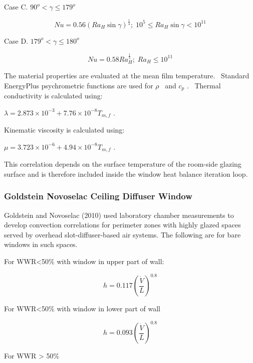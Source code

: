 Case C. \(90^o < \gamma \leq 179^o\)

\begin{equation}
Nu = 0.56{\left( {R{a_H}\sin \gamma } \right)^{{\frac{1}{4}}}};\;{10^5} \le R{a_H}\sin \gamma  < {10^{11}}
\end{equation}

Case D. \(179^o < \gamma \leq 180^o\)

\begin{equation}
Nu = 0.58Ra_H^{{\frac{1}{5}}};\;R{a_H} \le {10^{11}}
\end{equation}

The material properties are evaluated at the mean film temperature.~ Standard EnergyPlus psychrometric functions are used for \(\rho\) ~and \({c_p}\) .~ Thermal conductivity is calculated using:

\(\lambda = 2.873 \times {10^{ - 3}} + 7.76 \times {10^{ - 8}}{T_{m,f}}\) .

Kinematic viscosity is calculated using:

\(\mu = 3.723 \times {10^{ - 6}} + 4.94 \times {10^{ - 8}}{T_{m,f}}\) .

This correlation depends on the surface temperature of the room-side glazing surface and is therefore included inside the window heat balance iteration loop.

\subsubsection{Goldstein Novoselac Ceiling Diffuser Window}\label{goldstein-novoselac-ceiling-diffuser-window}

Goldstein and Novoselac (2010) used laboratory chamber measurements to develop convection correlations for perimeter zones with highly glazed spaces served by overhead slot-diffuser-based air systems. The following are for bare windows in such spaces.

For WWR\textless{}50\% with window in upper part of wall:

\begin{equation}
h = 0.117{\left( {\frac{{\dot V}}{L}} \right)^{0.8}}
\end{equation}

For WWR\textless{}50\% with window in lower part of wall

\begin{equation}
h = 0.093{\left( {\frac{{\dot V}}{L}} \right)^{0.8}}
\end{equation}

For WWR \textgreater{} 50\%

